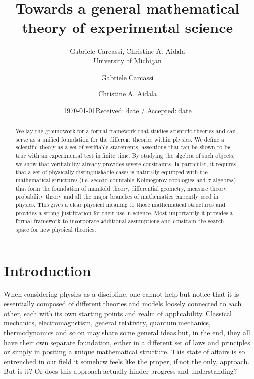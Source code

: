 \documentclass[letterpaper]{article}
\theoremstyle{plain}%
\theoremstyle{definition}
\theoremstyle{remark}
\numberwithin{equation}{section}
\begin{document}
\title{Towards a general mathematical theory of experimental science}


\ifarchive
\author{Gabriele Carcassi, Christine A. Aidala \\ University of Michigan}
\date{\today}
\else
\author{Gabriele Carcassi \and Christine A. Aidala}
\date{Received: date / Accepted: date}
\fi

\maketitle

\begin{abstract}
	We lay the groundwork for a formal framework that studies scientific theories and can serve as a unified foundation for the different theories within physics. We define a scientific theory as a set of verifiable statements, assertions that can be shown to be true with an experimental test in finite time. By studying the algebra of such objects, we show that verifiability already provides severe constraints. In particular, it requires that a set of physically distinguishable cases is naturally equipped with the mathematical structures (i.e. second-countable Kolmogorov topologies and $\sigma$-algebras) that form the foundation of manifold theory, differential geometry, measure theory, probability theory and all the major branches of mathematics currently used in physics. This gives a clear physical meaning to those mathematical structures and provides a strong justification for their use in science. Most importantly it provides a formal framework to incorporate additional assumptions and constrain the search space for new physical theories.
\end{abstract}


\section{Introduction}

When considering physics as a discipline, one cannot help but notice that it is essentially composed of different theories and models loosely connected to each other, each with its own starting points and realm of applicability. Classical mechanics, electromagnetism, general relativity, quantum mechanics, thermodynamics and so on may share some general ideas but, in the end, they all have their own separate foundation, either in a different set of laws and principles or simply in positing a unique mathematical structure. This state of affairs is so entrenched in our field it somehow feels like the proper, if not the only, approach. But is it? Or does this approach actually hinder progress and understanding?
\end{document}
